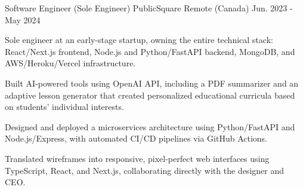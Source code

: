 \begin{cventries}
\cventry
{Software Engineer (Sole Engineer)} %
{PublicSquare} %
{Remote (Canada)} %
{Jun. 2023 - May 2024} %
{
  \begin{cvitems} %
    \item{Sole engineer at an early-stage startup, owning the entire technical stack: React/Next.js frontend, Node.js and Python/FastAPI backend, MongoDB, and AWS/Heroku/Vercel infrastructure.}
    \item{Built AI-powered tools using OpenAI API, including a PDF summarizer and an adaptive lesson generator that created personalized educational curricula based on students' individual interests.}
    \item{Designed and deployed a microservices architecture using Python/FastAPI and Node.js/Express, with automated CI/CD pipelines via GitHub Actions.}
    \item{Translated wireframes into responsive, pixel-perfect web interfaces using TypeScript, React, and Next.js, collaborating directly with the designer and CEO.}
  \end{cvitems}
}

\end{cventries}
